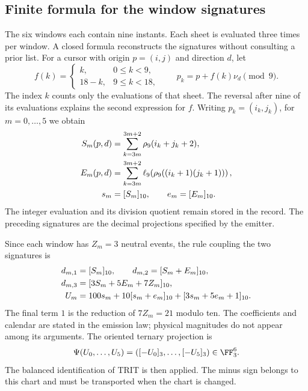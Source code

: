 \subsection{Finite formula for the window signatures}

The six windows each contain nine instants. Each sheet is evaluated
three times per window. A closed formula reconstructs the
signatures without consulting a prior list. For a cursor with origin
\(p=(i,j)\) and direction \(d\), let
\[
 f(k)=\begin{cases}k,&0\le k<9,\\18-k,&9\le k<18,
 \end{cases}\qquad p_k=p+f(k)\nu_d\pmod9.
\]
The index \(k\) counts only the evaluations of that sheet. The
reversal after nine of its evaluations explains the second
expression for \(f\). Writing \(p_k=(i_k,j_k)\), for
\(m=0,\ldots,5\) we obtain
\begin{align}
 S_m(p,d)&=\sum_{k=3m}^{3m+2}\rho_9(i_k+j_k+2),\notag\\
 E_m(p,d)&=\sum_{k=3m}^{3m+2}
       \ell_9\!\left(\rho_9((i_k+1)(j_k+1))\right),\notag\\
 s_m&=[S_m]_{10},\qquad e_m=[E_m]_{10}.
 \label{vi:reg:firmas}
\end{align}
The integer evaluation and its division quotient remain stored in
the record. The preceding signatures are the decimal projections
specified by the emitter.

Since each window has \(Z_m=3\) neutral events, the rule
coupling the two signatures is
\begin{align}
 d_{m,1}&=[S_m]_{10},\qquad
 d_{m,2}=[S_m+E_m]_{10},\notag\\
 d_{m,3}&=[3S_m+5E_m+7Z_m]_{10},\notag\\
 U_m&=100s_m+10[s_m+e_m]_{10}+[3s_m+5e_m+1]_{10}.
 \label{eq:emisor-seis}
\end{align}
The final term \(1\) is the reduction of \(7Z_m=21\) modulo
ten. The coefficients and calendar are stated in the emission
law; physical magnitudes do not appear among its arguments.
The oriented ternary projection is
\begin{equation}
 \Psi(U_0,\ldots,U_5)=([-U_0]_3,\ldots,[-U_5]_3)
 \in\FF_3^6.
 \label{eq:psi-catalogo}
\end{equation}
The balanced identification of TRIT is then applied. The minus
sign belongs to this chart and must be transported when the chart is changed.

